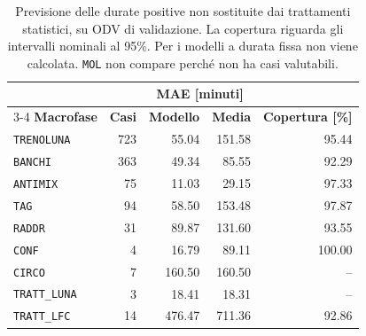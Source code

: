\begin{table}[htbp]
\centering
\small
\begin{tabular}{@{}lrrrr@{}}
\toprule
 & & \multicolumn{2}{c}{\textbf{MAE [minuti]}} & \\
\cmidrule(lr){3-4}
\textbf{Macrofase} & \textbf{Casi} & \textbf{Modello} & \textbf{Media} & \textbf{Copertura [\%]}\\
\midrule
\texttt{TRENOLUNA} & 723 & \num{55.04} & \num{151.58} & \num{95.44}\\
\texttt{BANCHI} & 363 & \num{49.34} & \num{85.55} & \num{92.29}\\
\texttt{ANTIMIX} & 75 & \num{11.03} & \num{29.15} & \num{97.33}\\
\texttt{TAG} & 94 & \num{58.50} & \num{153.48} & \num{97.87}\\
\texttt{RADDR} & 31 & \num{89.87} & \num{131.60} & \num{93.55}\\
\texttt{CONF} & 4 & \num{16.79} & \num{89.11} & \num{100.00}\\
\texttt{CIRCO} & 7 & \num{160.50} & \num{160.50} & --\\
\texttt{TRATT\_LUNA} & 3 & \num{18.41} & \num{18.31} & --\\
\texttt{TRATT\_LFC} & 14 & \num{476.47} & \num{711.36} & \num{92.86}\\
\bottomrule
\end{tabular}
\caption{Previsione delle durate positive non sostituite dai trattamenti statistici, su ODV di validazione. La copertura riguarda gli intervalli nominali al 95\%. Per i modelli a durata fissa non viene calcolata. \texttt{MOL} non compare perché non ha casi valutabili.}
\label{tab:duration-generation-results}
\end{table}
